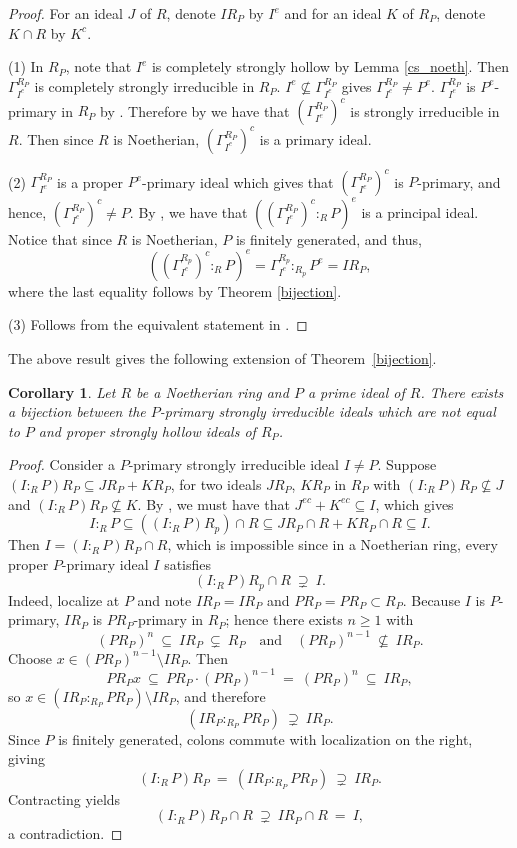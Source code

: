 \documentclass[11pt,english]{amsart}
\newtheorem{corollary}[theorem]{Corollary}
\theoremstyle{definition}
\numberwithin{equation}{section}
\theoremstyle{remark}
\begin{document}
\begin{proof}
   For an ideal $J$ of $R$, denote $IR_P$ by $I^e$ and for an ideal $K$ of $R_P$, denote $K\cap R$ by $K^c$. \par (1) In $R_P$, note that $I^e$ is completely strongly hollow by Lemma \ref{cs_noeth}. Then $\Gamma_{I^e}^{R_P}$ is completely strongly irreducible in $R_P$. $I^e\not\subseteq \Gamma_{I^e}^{R_P}$ gives $\Gamma_{I^e}^{R_P}\neq P^e$. $\Gamma_{I^e}^{R_P}$ is $P^e$-primary in $R_P$ by \cite[Corollary.~1.5]{FHO}. Therefore by \cite[Lemma.~2.2(4)]{HRR2002} we have that $(\Gamma_{I^e}^{R_P})^c$ is strongly irreducible in $R$. Then since $R$ is Noetherian, $(\Gamma_{I^e}^{R_P})^c$ is a primary ideal. \par (2) $\Gamma_{I^e}^{R_P}$ is a proper $P^e$-primary ideal which gives that $(\Gamma_{I^e}^{R_P})^c$ is $P$-primary, and hence, $(\Gamma_{I^e}^{R_P})^c\neq P$. By \cite[Corollary.~3.1]{HRR2002}, we have that $((\Gamma_{I^e}^{R_P})^c:_RP)^e$ is a principal ideal. Notice that since $R$ is Noetherian, $P$ is finitely generated, and thus, \[((\Gamma_{I^e}^{R_p})^c:_RP)^e=\Gamma_{I^e}^{R_p}:_{R_p}P^e=IR_P,\] where the last equality follows by Theorem \ref{bijection}.
   \par (3) Follows from the equivalent statement in \cite[Corollary.~3.1]{HRR2002}.
\end{proof}

The above result gives the following extension of Theorem~\ref{bijection}.

\begin{corollary}
    Let $R$ be a Noetherian ring and $P$ a prime ideal of $R$. There exists a bijection between the $P$-primary strongly irreducible ideals which are not equal to $P$ and proper strongly hollow ideals of $R_P$.
\end{corollary}

\begin{proof}
    Consider a $P$-primary strongly irreducible ideal $I\neq P$. Suppose $(I:_RP)R_P\subseteq JR_P+KR_P$, for two ideals $JR_P$, $KR_P$ in $R_P$ with $(I:_RP)R_P\not\subseteq J$ and $(I:_RP)R_P\not \subseteq K$. By \cite[Corollary 3.1]{HRR2002}, we must have that $J^{ec}+K^{ec}\subseteq I$, which gives  \[I:_RP\subseteq ((I:_RP)R_p)\cap R\subseteq JR_P\cap R+KR_P\cap R\subseteq I.\] Then $I=(I:_RP)R_P\cap R$,
    which is impossible since in a Noetherian ring, every proper $P$-primary ideal $I$ satisfies
\[
(I :_{R} P)R_p\cap R\ \supsetneq\ I.
\]
Indeed, localize at $P$ and note $IR_P=IR_{P}$ and $PR_P=PR_{P}\subset R_{P}$. Because $I$ is $P$-primary,
$IR_P$ is $PR_P$-primary in $R_{P}$; hence there exists $n\ge1$ with
\[
(PR_P)^{n}\ \subseteq\ IR_P\ \subsetneq\ R_{P}\quad\text{and}\quad (PR_P)^{n-1}\ \nsubseteq\ IR_P.
\]
Choose $x\in (PR_P)^{n-1}\setminus IR_P$. Then
\[
PR_Px\ \subseteq\ PR_P\cdot(PR_P)^{n-1}\ =\ (PR_P)^{n}\ \subseteq\ IR_P,
\]
so $x\in(IR_P :_{R_{P}} PR_P)\setminus IR_P$, and therefore
\[
(IR_P :_{R_{P}} PR_P)\ \supsetneq\ IR_P.
\]
Since $P$ is finitely generated, colons commute with localization on the right, giving
\[
(I :_{R} P)R_P\ =\ (IR_P :_{R_{P}} PR_P)\ \supsetneq\ IR_P.
\]
Contracting yields
\[
(I :_{R} P)R_P\cap R\ \supsetneq\ IR_P\cap R\ =\ I,
\]
a contradiction.
\end{proof}
\end{document}
